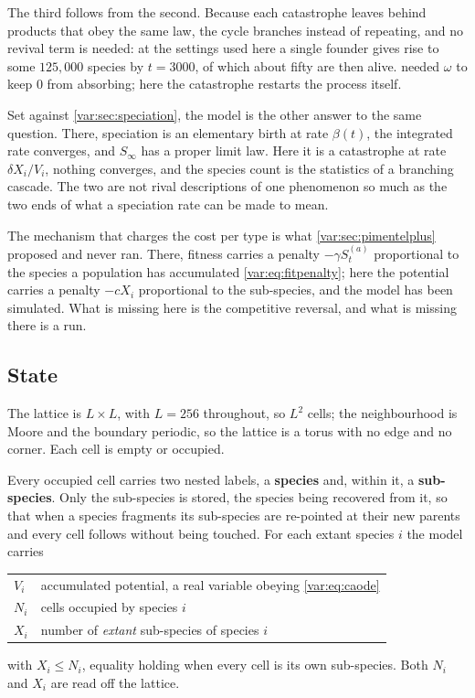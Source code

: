 The third follows from the second. Because each catastrophe leaves behind
products that obey the same law, the cycle branches instead of repeating,
and no revival term is needed: at the settings used here a single founder
gives rise to some $125{,}000$ species by $t=3000$, of which about fifty are
then alive.  needed $\omega$ to keep
$0$ from absorbing; here the catastrophe restarts the process itself.

Set against \cref{var:sec:speciation}, the model is the other answer to the
same question. There, speciation is an elementary birth at rate $\beta(t)$,
the integrated rate converges, and $S_\infty$ has a proper limit law. Here it
is a catastrophe at rate $\delta X_i/V_i$, nothing converges, and the species
count is the statistics of a branching cascade. The two are not rival
descriptions of one phenomenon so much as the two ends of what a speciation
rate can be made to mean.

The mechanism that charges the cost per type is what
\cref{var:sec:pimentelplus} proposed and never ran. There, fitness carries a
penalty $-\gamma S^{(a)}_t$ proportional to the species a population has
accumulated \cref{var:eq:fitpenalty}; here the potential carries a penalty
$-c X_i$ proportional to the sub-species, and the model has been simulated.
What is missing here is the competitive reversal, and what is missing there
is a run.

\subsection{State}
\label{var:sec:castate}

The lattice is $L\times L$, with $L=256$ throughout, so $L^2$ cells; the
neighbourhood is Moore and the boundary periodic, so the lattice is a torus
with no edge and no corner. Each cell is empty or occupied.

Every occupied cell carries two nested labels, a \textbf{species} and, within
it, a \textbf{sub-species}. Only the sub-species is stored, the species being
recovered from it, so that when a species fragments its sub-species are
re-pointed at their new parents and every cell follows without being touched.
For each extant species $i$ the model carries
\begin{center}
\begin{tabular}{@{}ll@{}}
$V_i$ & accumulated potential, a real variable obeying \cref{var:eq:caode} \\
$N_i$ & cells occupied by species $i$ \\
$X_i$ & number of \emph{extant} sub-species of species $i$ \\
\end{tabular}
\end{center}
with $X_i\le N_i$, equality holding when every cell is its own sub-species.
Both $N_i$ and $X_i$ are read off the lattice.

